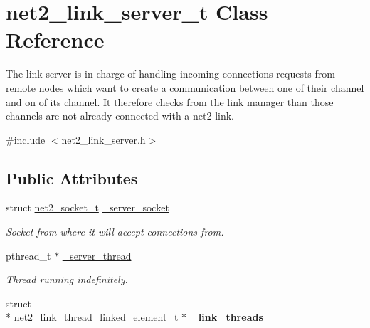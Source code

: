 \hypertarget{structnet2__link__server__t}{\section{net2\-\_\-link\-\_\-server\-\_\-t Class Reference}
\label{structnet2__link__server__t}
}


The link server is in charge of handling incoming connections requests from remote nodes which want to create a communication between one of their channel and on of its channel. It therefore checks from the link manager than those channels are not already connected with a net2 link.  




{\ttfamily \#include $<$net2\-\_\-link\-\_\-server.\-h$>$}

\subsection*{Public Attributes}
\begin{DoxyCompactItemize}
\item 
\hypertarget{structnet2__link__server__t_abcd4b2d9f1f25fc68d4100d1d897f11f}{struct \hyperlink{structnet2__socket__t}{net2\-\_\-socket\-\_\-t} \hyperlink{structnet2__link__server__t_abcd4b2d9f1f25fc68d4100d1d897f11f}{\-\_\-server\-\_\-socket}}\label{structnet2__link__server__t_abcd4b2d9f1f25fc68d4100d1d897f11f}

\begin{DoxyCompactList}\small\item\em Socket from where it will accept connections from. \end{DoxyCompactList}\item 
\hypertarget{structnet2__link__server__t_ade7ce485e3476cd2f003fd83c9226916}{pthread\-\_\-t $\ast$ \hyperlink{structnet2__link__server__t_ade7ce485e3476cd2f003fd83c9226916}{\-\_\-server\-\_\-thread}}\label{structnet2__link__server__t_ade7ce485e3476cd2f003fd83c9226916}

\begin{DoxyCompactList}\small\item\em Thread running indefinitely. \end{DoxyCompactList}\item 
\hypertarget{structnet2__link__server__t_aa827be9ec74ed0149e6ea70589f711bd}{struct \\*
\hyperlink{structnet2__link__thread__linked__element__t}{net2\-\_\-link\-\_\-thread\-\_\-linked\-\_\-element\-\_\-t} $\ast$ {\bfseries \-\_\-link\-\_\-threads}}\label{structnet2__link__server__t_aa827be9ec74ed0149e6ea70589f711bd}

\end{DoxyCompactItemize}


